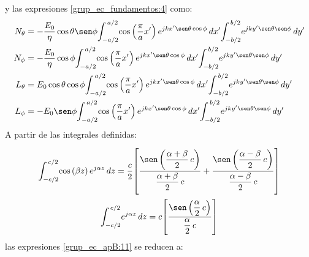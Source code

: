y las expresiones \eqref{grup_ec_fundamentos:4} como:
\begin{subequations}
\label{grup_ec_apB:11}
\begin{align}
N_{\theta} &= -\frac{E_0}{\eta}\cos\theta\sen\phi\!\int_{-a/2}^{\,a/2}\!\cos\left(\dfrac{\pi}{a}x'\right)e^{jkx'\sen\theta\cos\phi}\,dx'\!\int_{-b/2}^{\,b/2}\!e^{jky'\sen\theta\sen\phi}\,dy'
\label{ec_apB:54}\\
N_{\phi} &= -\frac{E_0}{\eta}\cos\phi\!\int_{-a/2}^{\,a/2}\!\cos\left(\dfrac{\pi}{a}x'\right)e^{jkx'\sen\theta\cos\phi}\,dx'\!\int_{-b/2}^{\,b/2}\!e^{jky'\sen\theta\sen\phi}\,dy'
\label{ec_apB:55}\\
L_{\theta}  &= E_0\cos\theta\cos\phi\!\int_{-a/2}^{\,a/2}\!\cos\left(\dfrac{\pi}{a}x'\right)e^{jkx'\sen\theta\cos\phi}\,dx'\!\int_{-b/2}^{\,b/2}\!e^{jky'\sen\theta\sen\phi}\,dy'
\label{ec_apB:56}\\
L_{\phi} &= -E_0\sen\phi\!\int_{-a/2}^{\,a/2}\!\cos\left(\dfrac{\pi}{a}x'\right)e^{jkx'\sen\theta\cos\phi}\,dx'\!\int_{-b/2}^{\,b/2}\!e^{jky'\sen\theta\sen\phi}\,dy'
\label{ec_apB:57}
\end{align}
\end{subequations}
A partir de las integrales definidas:
\begin{gather}
\int_{-c/2}^{\,c/2}\!\cos\left(\beta z\right)e^{j\alpha z}\,dz = \frac{c}{2}\!\left[\rule{0pt}{32pt}\dfrac{\sen\left(\dfrac{\alpha + \beta}{2}\, c\right)}{\dfrac{\alpha + \beta}{2}\, c} + \dfrac{\sen\left(\dfrac{\alpha - \beta}{2}\, c\right)}{\dfrac{\alpha - \beta}{2}\, c}\right]
\label{ec_apB:58}\\
\int_{-c/2}^{\,c/2}\!e^{j\alpha z}\,dz = c\!\left[\rule{0pt}{25pt}\dfrac{\sen\left(\dfrac{\alpha}{2}\, c\right)}{\dfrac{\alpha}{2}\, c}\right]
\label{ec_apB:59}
\end{gather}
las expresiones \eqref{grup_ec_apB:11} se reducen a:

